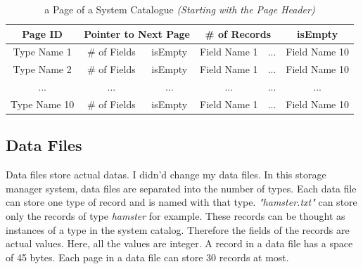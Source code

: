 \documentclass[12pt,a4paper]{article}
\begin{document}
        \begin{table}[h!]
                \begin{center}
                    \begin{tabular}{ | c | c | c || c | c | c | }
                    \hline
                    \multicolumn{1}{||c|}{Page ID} &
                    \multicolumn{2}{|c|}{Pointer to Next Page} &
                    \multicolumn{2}{|c|}{\# of Records} &
                    \multicolumn{1}{|c||}{isEmpty} \\
                    \hline
                    \hline
                    Type Name 1 & \# of Fields & isEmpty & Field Name 1 & ... & Field Name 10 \\
                    \hline
                    Type Name 2 & \# of Fields & isEmpty & Field Name 1 & ... & Field Name 10 \\
                    \hline
                    ... & ... & ... & ... & ... & ... \\
                    \hline
                    Type Name 10 & \# of Fields & isEmpty & Field Name 1 & ... & Field Name 10 \\
                    \hline
                    \end{tabular}
                \end{center}
            \caption{a Page of a System Catalogue \emph{(Starting with the Page Header)}}
            \label{table:3}
        \end{table}

    \subsection{Data Files}
        Data files store actual datas. I didn'd change my data files. In this storage manager system, data files are separated into the number of types. Each data file can store one type of record and is named with that type. \emph{"hamster.txt"} can store only the records of type \emph{hamster} for example. These records can be thought as instances of a type in the system catalog. Therefore the fields of the records are actual values. Here, all the values are integer. A record in a data file has a space of 45 bytes. Each page in a data file can store 30 records at most.
\end{document}
